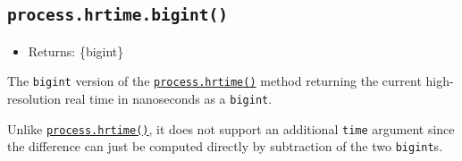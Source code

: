 \begin{Shaded}
\begin{Highlighting}[]
\OperatorTok{=} \NormalTok{(}\NormalTok{)}\OperatorTok{;}

\OperatorTok{=} \OperatorTok{;}
\OperatorTok{=} \NormalTok{()}\OperatorTok{;}
\CommentTok{// [ 1800216, 25 ]}

\NormalTok{(() }\KeywordTok{=\textgreater{}}\NormalTok{ \{}
  \OperatorTok{=} \OperatorTok{;}
  \CommentTok{// [ 1, 552 ]}

  \NormalTok{(}\SpecialCharTok{$\{}\NormalTok{diff[}\NormalTok{] }\OperatorTok{*}\OperatorTok{+}\NormalTok{ diff[}\NormalTok{]}\SpecialCharTok{\}}\NormalTok{)}\OperatorTok{;}
\NormalTok{\}}\OperatorTok{,} \NormalTok{)}\OperatorTok{;}
\end{Highlighting}
\end{Shaded}

\subsection{\texorpdfstring{\texttt{process.hrtime.bigint()}}{process.hrtime.bigint()}}\label{process.hrtime.bigint}

\begin{itemize}
\tightlist
\item
  Returns: \{bigint\}
\end{itemize}

The \texttt{bigint} version of the
\hyperref[processhrtimetime]{\texttt{process.hrtime()}} method returning
the current high-resolution real time in nanoseconds as a
\texttt{bigint}.

Unlike \hyperref[processhrtimetime]{\texttt{process.hrtime()}}, it does
not support an additional \texttt{time} argument since the difference
can just be computed directly by subtraction of the two
\texttt{bigint}s.

